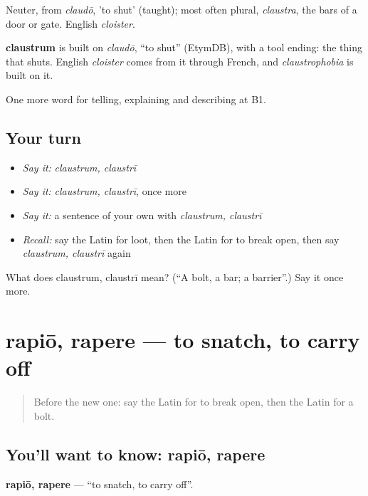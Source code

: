 Neuter, from \emph{claudō}, 'to shut' (taught); most often plural, \emph{claustra}, the bars of a door or gate. English \emph{cloister}.

\begin{cousinweb}
\textbf{claustrum} is built on \emph{claudō}, \textquotedblleft{}to shut\textquotedblright{} (EtymDB), with a tool ending: the thing that shuts. English \emph{cloister} comes from it through French, and \emph{claustrophobia} is built on it.
\end{cousinweb}

\begin{grammarlens}[title={What you've built}]
One more word for telling, explaining and describing at B1.
\end{grammarlens}

\subsection*{Your turn}
\begin{itemize}
\raggedright
  \item \emph{Say it:} \emph{claustrum, claustrī}
  \item \emph{Say it:} \emph{claustrum, claustrī}, once more
  \item \emph{Say it:} a sentence of your own with \emph{claustrum, claustrī}
  \item \emph{Recall:} say the Latin for loot, then the Latin for to break open, then say \emph{claustrum, claustrī} again
\end{itemize}

\begin{tcolorbox}[breakable,colback=teal!4,colframe=teal!35!black,title={Before you move on}]
What does claustrum, claustrī mean? (\textquotedblleft{}A bolt, a bar; a barrier\textquotedblright{}.) Say it once more.
\end{tcolorbox}
\section[rapiō, rapere]{rapiō, rapere — to snatch, to carry off}

\label{lesson:LA-C304-rapio}



\begin{quote}
Before the new one: say the Latin for to break open, then the Latin for a bolt.
\end{quote}

\subsection*{You'll want to know: rapiō, rapere}
\textbf{rapiō, rapere} — \textquotedblleft{}to snatch, to carry off\textquotedblright{}.

